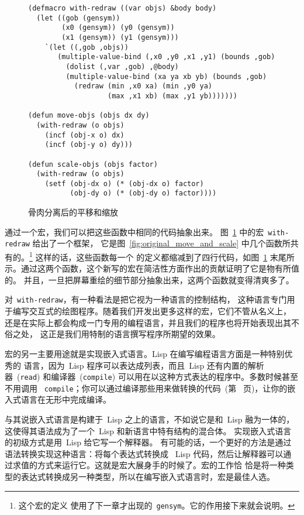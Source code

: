 \begin{figure}
\begin{lstlisting}
(defmacro with-redraw ((var objs) &body body)
  (let ((gob (gensym))
        (x0 (gensym)) (y0 (gensym))
        (x1 (gensym)) (y1 (gensym)))
    `(let ((,gob ,objs))
       (multiple-value-bind (,x0 ,y0 ,x1 ,y1) (bounds ,gob)
         (dolist (,var ,gob) ,@body)
         (multiple-value-bind (xa ya xb yb) (bounds ,gob)
           (redraw (min ,x0 xa) (min ,y0 ya)
                   (max ,x1 xb) (max ,y1 yb)))))))

(defun move-objs (objs dx dy)
  (with-redraw (o objs)
    (incf (obj-x o) dx)
    (incf (obj-y o) dy)))

(defun scale-objs (objs factor)
  (with-redraw (o objs)
    (setf (obj-dx o) (* (obj-dx o) factor)
          (obj-dy o) (* (obj-dy o) factor))))
\end{lstlisting}
\caption{\label{fig:move_and_scale_filleted}骨肉分离后的平移和缩放}
\end{figure}

通过一个宏，我们可以把这些函数中相同的代码抽象出来。
图~\ref{fig:move_and_scale_filleted} 中的宏~\texttt{with-redraw} 给出了一个框架，
它是图~\ref{fig:original_move_and_scale} 中几个函数所共有的。\footnote{这个宏的定义
使用了下一章才出现的~\texttt{gensym}。它的作用接下来就会说明。} 这样的话，这些函数每一个
的定义都缩减到了四行代码，如图~\ref{fig:move_and_scale_filleted}
末尾所示。通过这两个函数，这个新写的宏在简洁性方面作出的贡献证明了它是物有所值的。
并且，一旦把屏幕重绘的细节部分抽象出来，这两个函数就变得清爽多了。

对~\texttt{with-redraw}\label{mac:with-redraw}，有一种看法是把它视为一种语言的控制结构，
这种语言专门用于编写交互式的绘图程序。随着我们开发出更多这样的宏，它们不管从名义上，
还是在实际上都会构成一门专用的编程语言，并且我们的程序也将开始表现出其不俗之处，
这正是我们用特制的语言撰写程序所期望的效果。

宏的另一主要用途就是实现嵌入式语言。Lisp 在编写编程语言方面是一种特别优秀的
语言，因为~Lisp 程序可以表达成列表，而且~Lisp 还有内置的解析器~(\texttt{read})
和编译器~(\texttt{compile}) 可以用在以这种方式表达的程序中。多数时候甚至不用调用
~\texttt{compile}；你可以通过编译那些用来做转换的代码~(第~\pageref{page:compile} 页)，让你的嵌入式语言在无形中完成编译。

与其说嵌入式语言是构建于~Lisp 之上的语言，不如说它是和~Lisp 融为一体的，
这使得其语法成为了一个~Lisp 和新语言中特有结构的混合体。
实现嵌入式语言的初级方式是用~Lisp 给它写一个解释器。
有可能的话，一个更好的方法是通过语法转换实现这种语言：将每个表达式转换成
~Lisp 代码，然后让解释器可以通过求值的方式来运行它。这就是宏大展身手的时候了。宏的工作恰
恰是将一种类型的表达式转换成另一种类型，所以在编写嵌入式语言时，宏是最佳人选。

